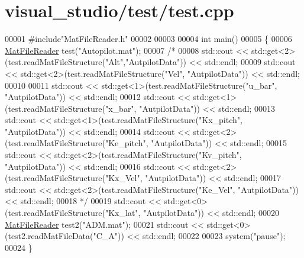 \hypertarget{visual__studio_2test_2test_8cpp_source}{}\section{visual\+\_\+studio/test/test.cpp}
\label{visual__studio_2test_2test_8cpp_source}

\begin{DoxyCode}
00001 \textcolor{preprocessor}{#include"MatFileReader.h"}
00002 
00003 
00004 \textcolor{keywordtype}{int} main()
00005 \{
00006     \hyperlink{class_mat_file_reader}{MatFileReader} test(\textcolor{stringliteral}{"Autopilot.mat"});
00007     \textcolor{comment}{/*}
00008 \textcolor{comment}{    std::cout << std::get<2>(test.readMatFileStructure("Alt","AutpilotData")) << std::endl;}
00009 \textcolor{comment}{    std::cout << std::get<2>(test.readMatFileStructure("Vel", "AutpilotData")) << std::endl;}
00010 \textcolor{comment}{}
00011 \textcolor{comment}{    std::cout << std::get<1>(test.readMatFileStructure("u\_bar", "AutpilotData")) << std::endl;}
00012 \textcolor{comment}{    std::cout << std::get<1>(test.readMatFileStructure("x\_bar", "AutpilotData")) << std::endl;}
00013 \textcolor{comment}{    std::cout << std::get<1>(test.readMatFileStructure("Kx\_pitch", "AutpilotData")) << std::endl;}
00014 \textcolor{comment}{    std::cout << std::get<2>(test.readMatFileStructure("Ke\_pitch", "AutpilotData")) << std::endl;}
00015 \textcolor{comment}{    std::cout << std::get<2>(test.readMatFileStructure("Kv\_pitch", "AutpilotData")) << std::endl;}
00016 \textcolor{comment}{    std::cout << std::get<2>(test.readMatFileStructure("Kx\_Vel", "AutpilotData")) << std::endl;}
00017 \textcolor{comment}{    std::cout << std::get<2>(test.readMatFileStructure("Ke\_Vel", "AutpilotData")) << std::endl;}
00018 \textcolor{comment}{    */}
00019     std::cout << std::get<0>(test.readMatFileStructure(\textcolor{stringliteral}{"Kx\_lat"}, \textcolor{stringliteral}{"AutpilotData"})) << std::endl;
00020     \hyperlink{class_mat_file_reader}{MatFileReader} test2(\textcolor{stringliteral}{"ADM.mat"});
00021     std::cout << std::get<0>(test2.readMatFileData(\textcolor{stringliteral}{"C\_A"})) << std::endl;
00022     
00023     system(\textcolor{stringliteral}{"pause"});
00024 \}
\end{DoxyCode}
